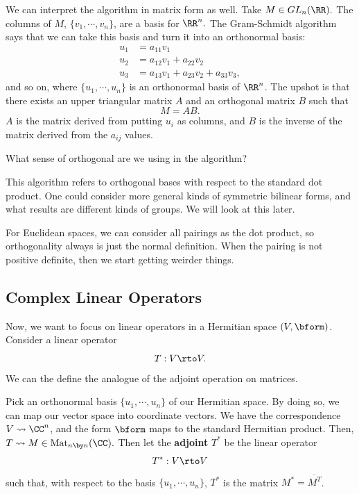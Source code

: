 We can interpret the algorithm in matrix form as well. 
Take $M \in GL_n(\RR).$ The columns of $M$, $\{v_1, \cdots, v_n\}$, are a basis for $\RR^n.$ 
The Gram-Schmidt algorithm says that we can take this basis and turn it into an orthonormal basis:
\begin{align*}
    u_1 &= a_{11}v_1 \\
    u_2 &= a_{12}v_1 + a_{22}v_2 \\
    u_3 &= a_{13}v_1 + a_{23}v_2 + a_{33}v_3,
\end{align*}
and so on, where $\{u_1, \cdots, u_n\}$ is an orthonormal basis of $\RR^n$.
The upshot is that there exists an upper triangular matrix $A$ and an orthogonal matrix $B$ such that \[M = AB.\] $A$ is the matrix derived from putting $u_i$ as columns, and $B$ is the inverse of the matrix derived from the $a_{ij}$ values.  
\begin{question}
    What sense of orthogonal are we using in the algorithm?
\end{question}
\begin{ans}
    This algorithm refers to orthogonal bases with respect to the standard dot product. 
    One could consider more general kinds of symmetric bilinear forms, and what results are different kinds of groups. 
    We will look at this later. 
    
    For Euclidean spaces, we can consider all pairings as the dot product, so orthogonality always is just the normal definition.
    When the pairing is not positive definite, then we start getting weirder things.
\end{ans}
\subsection{Complex Linear Operators}
Now, we want to focus on linear operators in a Hermitian space $(V, \bform)$. Consider a linear operator 
\[
T: V \rto V.
\]
We can the define the analogue of the adjoint operation on matrices.
\begin{definition}
Pick an orthonormal basis $\{u_1, \cdots, u_n\}$ of our Hermitian space. By doing so, we can map our vector space into coordinate vectors. We have the correspondence $V \rightsquigarrow \CC^n$, and the form $\bform$ maps to the standard Hermitian product. Then, $T \rightsquigarrow M \in \text{Mat}_{n \by n}(\CC).$ Then let the \textbf{adjoint} $T^*$ be the linear operator
\[
T^*: V \rto V
\]
such that, with respect to the basis $\{u_1, \cdots, u_n \}$, $T^*$ is the matrix $M^* = \overline{M^T}$. 
\end{definition}

